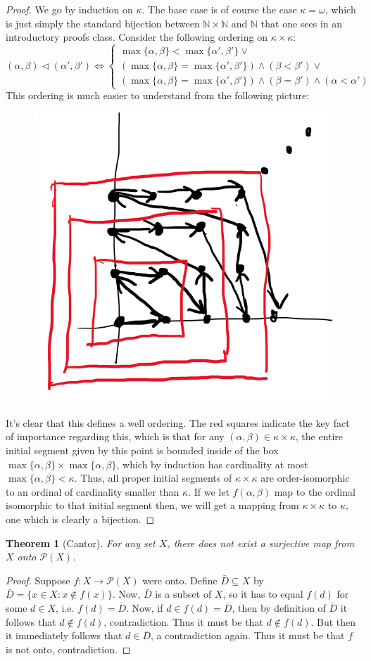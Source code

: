 \documentclass{article}
\theoremstyle{definition}
\theoremstyle{plain}
\theoremstyle{theorem}
\newtheorem{theorem}{Theorem}[section]
\begin{document}
\begin{proof}
	We go by induction on $\kappa$. The base case is of course the case $\kappa = \omega$, which is just simply the standard bijection between $\mathbb{N} \times \mathbb{N}$ and $\mathbb{N}$ that one sees in an introductory proofs class. Consider the following ordering on $\kappa \times \kappa$:
	\[ (\alpha,\beta) \triangleleft (\alpha',\beta') \iff 
	\begin{cases}
		\max\{\alpha,\beta\} < \max\{\alpha',\beta'\} \vee \\
		(\max\{\alpha,\beta\} = \max\{\alpha',\beta'\}) \wedge (\beta < \beta') \vee \\
		(\max\{\alpha,\beta\} = \max\{\alpha',\beta'\}) \wedge (\beta = \beta') \wedge (\alpha < \alpha') 
	\end{cases} \]
This ordering is much easier to understand from the following picture:
\begin{figure}[H]
	\centering
  \includegraphics[width=0.4\linewidth]{winding.png}
  \label{fig:test1}
\end{figure} 
It's clear that this defines a well ordering. The red squares indicate the key fact of importance regarding this, which is that for any $(\alpha,\beta) \in \kappa \times \kappa$, the entire initial segment given by this point is bounded inside of the box $\max\{\alpha,\beta\} \times \max\{\alpha,\beta\}$, which by induction has cardinality at most $\max\{\alpha,\beta\} < \kappa$. Thus, all proper initial segments of $\kappa \times \kappa$ are order-isomorphic to an ordinal of cardinality smaller than $\kappa$. If we let $f(\alpha,\beta)$ map to the ordinal isomorphic to that initial segment then, we will get a mapping from $\kappa \times \kappa$ to $\kappa$, one which is clearly a bijection. 
\end{proof}
\begin{theorem}[Cantor]
	For any set $X$, there does not exist a surjective map from $X$ onto $\mathcal{P}(X)$. 
\end{theorem}
\begin{proof}
	Suppose $f: X \to \mathcal{P}(X)$ were onto. Define $\bar{D} \subseteq X$ by $\bar{D} = \{x \in X: x \notin f(x)\}$. Now, $\bar{D}$ is a subset of $X$, so it has to equal $f(d)$ for some $d \in X$, i.e. $f(d) = \bar{D}$. Now, if $d \in f(d) = \bar{D}$, then by definition of $\bar{D}$ it follows that $d \notin f(d)$, contradiction. Thus it must be that $d \notin f(d)$. But then it immediately follows that $d \in \bar{D}$, a contradiction again. Thus it must be that $f$ is not onto, contradiction. 
\end{proof}
\end{document}
